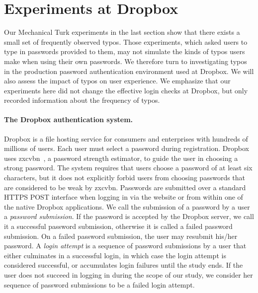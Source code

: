\section{Experiments at Dropbox}
\label{sec:dropbox}

Our Mechanical Turk experiments in the last section show that there exists a
small set of frequently observed typos. Those experiments, which asked users to type
in passwords provided to them, may not simulate the kinds of typos users make
when using their own passwords. We therefore turn to investigating typos in the
production password authentication environment used at Dropbox. We will also
assess the impact of typos on user experience. We emphasize that our experiments
here did not change the effective login checks at Dropbox, but only recorded
information about the frequency of typos. 

\paragraph{The Dropbox authentication system.} Dropbox is a file
hosting service for consumers and enterprises with hundreds of
millions of users. Each user must select a password during
registration. Dropbox uses zxcvbn~\cite{dropbox2012zxcvbn}, a password
strength estimator, to guide the user in choosing a strong
password. The system requires that users choose a password of at least
six characters, but it does not explicitly forbid users from choosing
passwords that are considered to be weak by zxcvbn. Passwords are
submitted over a standard HTTPS POST interface when logging in via the
website or from within one of the native Dropbox applications. We call the
submission of a password by a user a {\em password submission}.  If the
password is accepted by the Dropbox server, we call it a  successful
password submission, otherwise it is called a failed password
submission.  On a failed password submission, the user may resubmit his/her
password. A {\em login attempt} is a sequence of password submissions by a user that either
culminates in a successful login, in which case the login attempt is considered successful, or accumulates login failures until the study ends. If
the user does not
succeed in logging in during the scope of our study, we consider her sequence of password submissions to be a failed login attempt.


